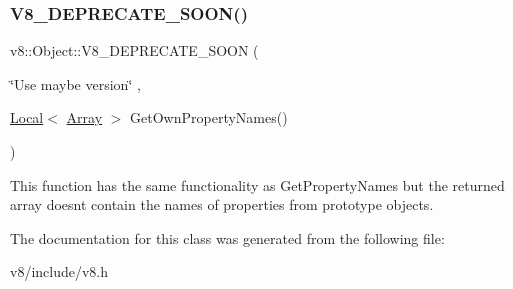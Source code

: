 \subsubsection{\texorpdfstring{V8\+\_\+\+D\+E\+P\+R\+E\+C\+A\+T\+E\+\_\+\+S\+O\+O\+N()}{V8\_DEPRECATE\_SOON()}\hspace{0.1cm}{\footnotesize\ttfamily [2/2]}}
{\footnotesize\ttfamily v8\+::\+Object\+::\+V8\+\_\+\+D\+E\+P\+R\+E\+C\+A\+T\+E\+\_\+\+S\+O\+ON (\begin{DoxyParamCaption}\item[{\char`\"{}Use maybe version\char`\"{}}]{,  }\item[{\mbox{\hyperlink{classv8_1_1Local}{Local}}$<$ \mbox{\hyperlink{classv8_1_1Array}{Array}} $>$ }]{Get\+Own\+Property\+Names() }\end{DoxyParamCaption})}

This function has the same functionality as Get\+Property\+Names but the returned array doesn\textquotesingle{}t contain the names of properties from prototype objects. 

The documentation for this class was generated from the following file\+:\begin{DoxyCompactItemize}
\item 
v8/include/v8.\+h\end{DoxyCompactItemize}
